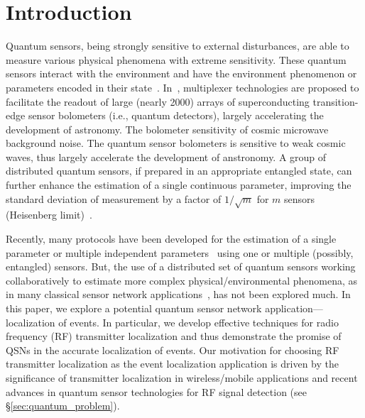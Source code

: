 \section{Introduction}

Quantum sensors, being strongly sensitive to external disturbances, are able to measure various physical phenomena with extreme sensitivity.
These quantum sensors interact with the environment and have the environment phenomenon or parameters encoded in their state~\cite{RevModPhys.quantumsensing}.
In~\cite{kaiwen1,kaiwen2}, multiplexer technologies are proposed to facilitate the readout of large (nearly 2000) 
arrays of superconducting transition-edge sensor bolometers (i.e., quantum detectors), largely accelerating the development of astronomy.
The bolometer sensitivity of cosmic microwave background noise.
The quantum sensor bolometers is sensitive to weak cosmic waves, thus largely accelerate the development of anstronomy.
A group of distributed quantum sensors, if prepared in an appropriate entangled state, can further enhance the estimation of a single continuous parameter, improving the standard deviation of measurement by a factor of $1/\sqrt{m}$ for $m$ sensors (Heisenberg limit)~\cite{Giovannetti_2011}.

Recently, many protocols have been developed for the estimation of a single 
parameter or multiple independent parameters~\cite{Giovannetti_2011,mpe_2018} using one or multiple (possibly, entangled) sensors. 
But, the use of a distributed set of quantum sensors working collaboratively 
to estimate more complex physical/environmental phenomena, as in many classical
sensor network applications~\cite{tsn17-water, sensys10-health,mobicom03-sensor}, 
has not been explored much.
In this paper, we explore a potential quantum sensor network application--- localization of events.
In particular, we develop effective techniques 
for radio frequency (RF) transmitter localization and thus demonstrate the promise of QSNs in the accurate localization of events. Our motivation for choosing 
RF transmitter localization as the event localization 
application is driven by the significance of transmitter localization
in  wireless/mobile applications and recent advances in quantum sensor
technologies for RF signal detection (see \S\ref{sec:quantum_problem}).

